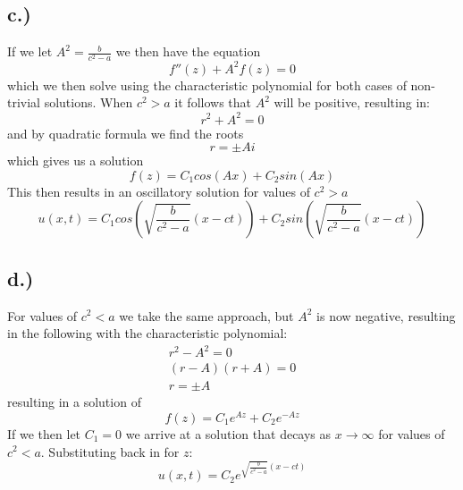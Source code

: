 \documentclass{article}
\begin{document}
\subsection*{c.)}
If we let $A^2 = \frac{b}{c^2 -a}$ we then have the equation
\begin{equation}
f''(z) + A^2f(z) = 0
\end{equation}
which we then solve using the characteristic polynomial for both cases of non-trivial solutions. When $c^2 > a$ it follows that $A^2$ will be positive, resulting in:
\begin{equation}
r^2 + A^2 = 0
\end{equation}
and by quadratic formula we find the roots
\begin{equation}
r = \pm Ai
\end{equation}
which gives us a solution 
\begin{equation}
f(z) = C_1cos(Ax) + C_2sin(Ax)
\end{equation}
This then results in an oscillatory solution for values of $c^2 > a$
\begin{equation}
u(x, t) = C_1cos(\sqrt{\frac{b}{c^2 - a}}(x - ct)) + C_2sin(\sqrt{\frac{b}{c^2 - a}}(x - ct))
\end{equation}
\subsection*{d.)}
For values of $c^2<a$ we take the same approach, but $A^2$ is now negative, resulting in the following with the characteristic polynomial:
\begin{equation}
\begin{aligned}
r^2 - A^2 = 0\\
(r - A)(r + A) = 0\\
r = \pm A
\end{aligned}
\end{equation}
resulting in a solution of
\begin{equation}
f(z) = C_1e^{Az} + C_2e^{-Az}
\end{equation}
If we then let $C_1 = 0$ we arrive at a solution that decays as $x \to \infty$ for values of $c^2 < a$. Substituting back in for $z$:
\begin{equation}
u(x,t) = C_2e^{\sqrt{\frac{b}{c^2 - a}}(x-ct)}
\end{equation}
\end{document}
